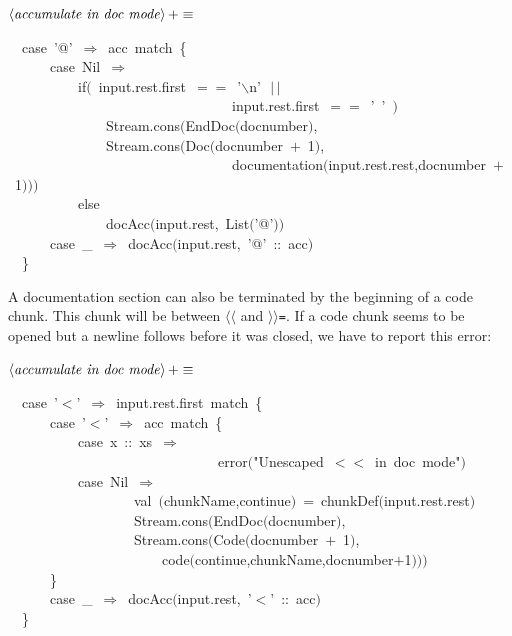 \documentclass[a4paper,12pt]{article}
\begin{document}
$\left<\mbox{\emph{accumulate in doc mode}}\right>+\equiv$
\begin{program}~~{\vem case}~'@'~$\Rightarrow$~acc~{\vem match}~{\small\{}
\\~~~~~~{\vem case}~Nil~$\Rightarrow$
\\~~~~~~~~~~{\vem if}$($~input.rest.first~$==$~'$\backslash$n'~$\,|$$\,|$
\\~~~~~~~~~~~~~~~~~~~~~~~~~~~~~~~~input.rest.first~$==$~'~'~$)$
\\~~~~~~~~~~~~~~Stream.cons$($EndDoc$($docnumber$)$,
\\~~~~~~~~~~~~~~Stream.cons$($Doc$($docnumber~$+$~1$)$,
\\~~~~~~~~~~~~~~~~~~~~~~~~~~~~~~~~documentation$($input.rest.rest,docnumber~$+$~1$)$$)$$)$
\\~~~~~~~~~~{\vem else}
\\~~~~~~~~~~~~~~docAcc$($input.rest,~List$($'@'$)$$)$
\\~~~~~~{\vem case}~\_~$\Rightarrow$~docAcc$($input.rest,~'@'~{\rm :}{\rm :}~acc$)$
\\~~{\small\}}
\\[0.5em]\end{program}


A documentation section can also be terminated by the beginning of a
code chunk. This chunk will be between \texttt{$\langle$$\langle$} and \texttt{$\rangle$$\rangle$=}. If a code
chunk seems to be opened but a newline follows before it was closed,
we have to report this error:

$\left<\mbox{\emph{accumulate in doc mode}}\right>+\equiv$
\begin{program}~~{\vem case}~'$<$'~$\Rightarrow$~input.rest.first~{\vem match}~{\small\{}
\\~~~~~~{\vem case}~'$<$'~$\Rightarrow$~acc~{\vem match}~{\small\{}
\\~~~~~~~~~~{\vem case}~x~{\rm :}{\rm :}~xs~$\Rightarrow$
\\~~~~~~~~~~~~~~~~~~~~~~~~~~~~~~error$($"Unescaped~$<\!$$<$~in~doc~mode"$)$
\\~~~~~~~~~~{\vem case}~Nil~$\Rightarrow$
\\~~~~~~~~~~~~~~~~~~{\vem val}~$($chunkName,continue$)$~=~chunkDef$($input.rest.rest$)$
\\~~~~~~~~~~~~~~~~~~Stream.cons$($EndDoc$($docnumber$)$,
\\~~~~~~~~~~~~~~~~~~Stream.cons$($Code$($docnumber~$+$~1$)$,
\\~~~~~~~~~~~~~~~~~~~~~~code$($continue,chunkName,docnumber$+$1$)$$)$$)$
\\~~~~~~{\small\}}
\\~~~~~~{\vem case}~\_~$\Rightarrow$~docAcc$($input.rest,~'$<$'~{\rm :}{\rm :}~acc$)$
\\~~{\small\}}
\\[0.5em]\end{program}
\end{document}
